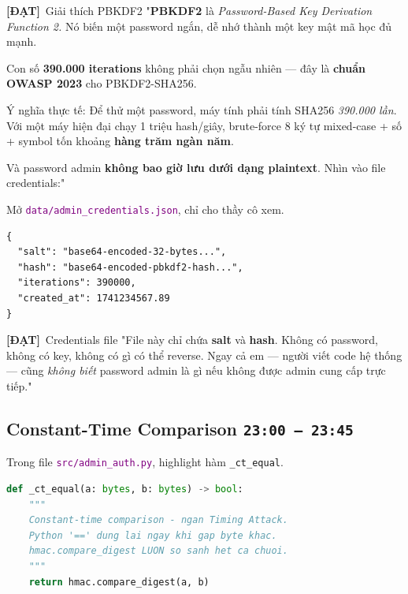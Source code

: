 \documentclass[12pt, a4paper]{article}
\newcommand{\timing}[1]{%
  \hfill\colorbox{NavyBlue!20}{\texttt{\small #1}}%
}
\newcommand{\dat}{\textcolor{BrickRed}{\textbf{[ĐẠT]}}}
\newcommand{\fpath}[1]{\texttt{\textcolor{purple}{#1}}}
\begin{document}
\begin{dialog}{\dat\ Giải thích PBKDF2}
"\textbf{PBKDF2} là \textit{Password-Based Key Derivation Function 2.}
Nó biến một password ngắn, dễ nhớ thành một key mật mã học đủ mạnh.

Con số \textbf{390.000 iterations} không phải chọn ngẫu nhiên ---
đây là \textbf{chuẩn OWASP 2023} cho PBKDF2-SHA256.

Ý nghĩa thực tế:
Để thử một password, máy tính phải tính SHA256 \textit{390.000 lần}.
Với một máy hiện đại chạy 1 triệu hash/giây,
brute-force 8 ký tự mixed-case + số + symbol
tốn khoảng \textbf{hàng trăm ngàn năm}.

Và password admin \textbf{không bao giờ lưu dưới dạng plaintext}.
Nhìn vào file credentials:"
\end{dialog}

\begin{action}
Mở \fpath{data/admin\_credentials.json}, chỉ cho thầy cô xem.
\end{action}

\begin{lstlisting}[caption={data/admin\_credentials.json}]
{
  "salt": "base64-encoded-32-bytes...",
  "hash": "base64-encoded-pbkdf2-hash...",
  "iterations": 390000,
  "created_at": 1741234567.89
}
\end{lstlisting}

\begin{dialog}{\dat\ Credentials file}
"File này chỉ chứa \textbf{salt} và \textbf{hash}.
Không có password, không có key, không có gì có thể reverse.
Ngay cả em --- người viết code hệ thống ---
cũng \textit{không biết} password admin là gì
nếu không được admin cung cấp trực tiếp."
\end{dialog}

\subsection{Constant-Time Comparison \timing{23:00 – 23:45}}

\begin{action}
Trong file \fpath{src/admin\_auth.py}, highlight hàm \texttt{\_ct\_equal}.
\end{action}

\begin{lstlisting}[language=Python, caption={src/admin\_auth.py --- Timing Attack Prevention}]
def _ct_equal(a: bytes, b: bytes) -> bool:
    """
    Constant-time comparison - ngan Timing Attack.
    Python '==' dung lai ngay khi gap byte khac.
    hmac.compare_digest LUON so sanh het ca chuoi.
    """
    return hmac.compare_digest(a, b)
\end{lstlisting}
\end{document}
